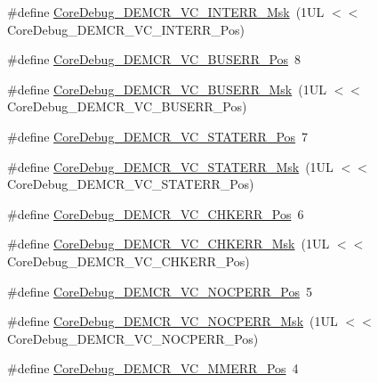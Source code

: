 \begin{DoxyCompactItemize}
\item 
\#define \mbox{\hyperlink{group___c_m_s_i_s___core_debug_gad6815d8e3df302d2f0ff2c2c734ed29a}{Core\+Debug\+\_\+\+D\+E\+M\+C\+R\+\_\+\+V\+C\+\_\+\+I\+N\+T\+E\+R\+R\+\_\+\+Msk}}~(1\+U\+L $<$$<$ Core\+Debug\+\_\+\+D\+E\+M\+C\+R\+\_\+\+V\+C\+\_\+\+I\+N\+T\+E\+R\+R\+\_\+\+Pos)
\item 
\#define \mbox{\hyperlink{group___c_m_s_i_s___core_debug_gab8e3d8f0f9590a51bbf10f6da3ad6933}{Core\+Debug\+\_\+\+D\+E\+M\+C\+R\+\_\+\+V\+C\+\_\+\+B\+U\+S\+E\+R\+R\+\_\+\+Pos}}~8
\item 
\#define \mbox{\hyperlink{group___c_m_s_i_s___core_debug_ga9d29546aefe3ca8662a7fe48dd4a5b2b}{Core\+Debug\+\_\+\+D\+E\+M\+C\+R\+\_\+\+V\+C\+\_\+\+B\+U\+S\+E\+R\+R\+\_\+\+Msk}}~(1\+U\+L $<$$<$ Core\+Debug\+\_\+\+D\+E\+M\+C\+R\+\_\+\+V\+C\+\_\+\+B\+U\+S\+E\+R\+R\+\_\+\+Pos)
\item 
\#define \mbox{\hyperlink{group___c_m_s_i_s___core_debug_ga16f0d3d2ce1e1e8cd762d938ac56c4ac}{Core\+Debug\+\_\+\+D\+E\+M\+C\+R\+\_\+\+V\+C\+\_\+\+S\+T\+A\+T\+E\+R\+R\+\_\+\+Pos}}~7
\item 
\#define \mbox{\hyperlink{group___c_m_s_i_s___core_debug_gaa38b947d77672c48bba1280c0a642e19}{Core\+Debug\+\_\+\+D\+E\+M\+C\+R\+\_\+\+V\+C\+\_\+\+S\+T\+A\+T\+E\+R\+R\+\_\+\+Msk}}~(1\+U\+L $<$$<$ Core\+Debug\+\_\+\+D\+E\+M\+C\+R\+\_\+\+V\+C\+\_\+\+S\+T\+A\+T\+E\+R\+R\+\_\+\+Pos)
\item 
\#define \mbox{\hyperlink{group___c_m_s_i_s___core_debug_ga10fc7c53bca904c128bc8e1a03072d50}{Core\+Debug\+\_\+\+D\+E\+M\+C\+R\+\_\+\+V\+C\+\_\+\+C\+H\+K\+E\+R\+R\+\_\+\+Pos}}~6
\item 
\#define \mbox{\hyperlink{group___c_m_s_i_s___core_debug_ga2f98b461d19746ab2febfddebb73da6f}{Core\+Debug\+\_\+\+D\+E\+M\+C\+R\+\_\+\+V\+C\+\_\+\+C\+H\+K\+E\+R\+R\+\_\+\+Msk}}~(1\+U\+L $<$$<$ Core\+Debug\+\_\+\+D\+E\+M\+C\+R\+\_\+\+V\+C\+\_\+\+C\+H\+K\+E\+R\+R\+\_\+\+Pos)
\item 
\#define \mbox{\hyperlink{group___c_m_s_i_s___core_debug_gac9d13eb2add61f610d5ced1f7ad2adf8}{Core\+Debug\+\_\+\+D\+E\+M\+C\+R\+\_\+\+V\+C\+\_\+\+N\+O\+C\+P\+E\+R\+R\+\_\+\+Pos}}~5
\item 
\#define \mbox{\hyperlink{group___c_m_s_i_s___core_debug_ga03ee58b1b02fdbf21612809034562f1c}{Core\+Debug\+\_\+\+D\+E\+M\+C\+R\+\_\+\+V\+C\+\_\+\+N\+O\+C\+P\+E\+R\+R\+\_\+\+Msk}}~(1\+U\+L $<$$<$ Core\+Debug\+\_\+\+D\+E\+M\+C\+R\+\_\+\+V\+C\+\_\+\+N\+O\+C\+P\+E\+R\+R\+\_\+\+Pos)
\item 
\#define \mbox{\hyperlink{group___c_m_s_i_s___core_debug_ga444454f7c7748e76cd76c3809c887c41}{Core\+Debug\+\_\+\+D\+E\+M\+C\+R\+\_\+\+V\+C\+\_\+\+M\+M\+E\+R\+R\+\_\+\+Pos}}~4
$$
\end{DoxyCompactItemize}
